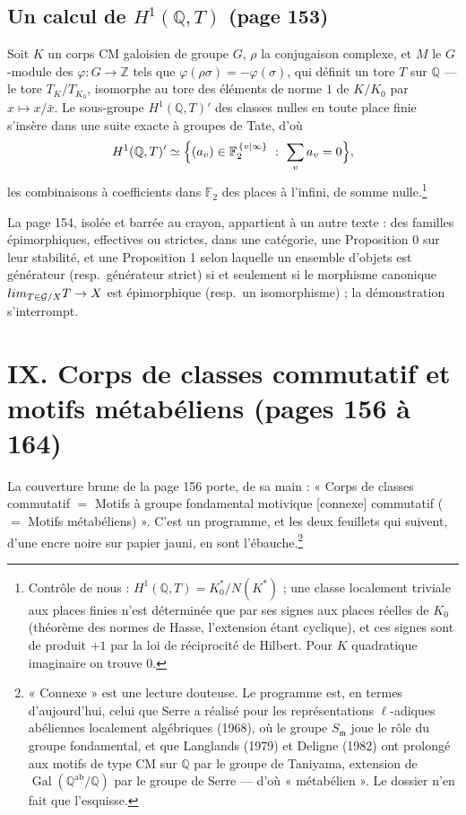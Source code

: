 \documentclass[11pt,a4paper]{article}
\begin{document}
\subsection*{Un calcul de $H^{1}(\mathbb{Q}, T)$ (page 153)}

Soit $K$ un corps CM galoisien de groupe $G$, $\rho$ la conjugaison complexe, et
$M$ le $G$-module des $\varphi \colon G \to \mathbb{Z}$ tels que $\varphi(\rho
\sigma) = -\varphi(\sigma)$, qui définit un tore $T$ sur $\mathbb{Q}$ --- le tore
$T_{K}/T_{K_{0}}$, isomorphe au tore des éléments de norme $1$ de $K/K_{0}$ par
$x \mapsto x/\bar{x}$. Le sous-groupe $H^{1}(\mathbb{Q}, T)'$ des classes nulles
en toute place finie s'insère dans une suite exacte à groupes de Tate, d'où
\[
  H^{1}(\mathbb{Q}, T)' \simeq \Bigl\{ (a_{v}) \in \mathbb{F}_{2}^{\,
  \{v \mid \infty\}} \ :\ \sum_{v} a_{v} = 0 \Bigr\} ,
\]
les combinaisons à coefficients dans $\mathbb{F}_{2}$ des places à l'infini, de
somme nulle.\footnote{Contrôle de nous : $H^{1}(\mathbb{Q}, T) =
K_{0}^{*}/N(K^{*})$ ; une classe localement triviale aux places finies n'est
déterminée que par ses signes aux places réelles de $K_{0}$ (théorème des normes
de Hasse, l'extension étant cyclique), et ces signes sont de produit $+1$ par la
loi de réciprocité de Hilbert. Pour $K$ quadratique imaginaire on trouve $0$.}

La page 154, isolée et barrée au crayon, appartient à un autre texte : des
familles épimorphiques, effectives ou strictes, dans une catégorie, une
Proposition 0 sur leur stabilité, et une Proposition 1 selon laquelle un ensemble d'objets est générateur (resp.\
générateur strict) si et seulement si le morphisme canonique
$\varinjlim_{T \in \mathcal{G}/X} T \to X$ est épimorphique (resp.\ un
isomorphisme) ; la démonstration s'interrompt.

\section*{IX. Corps de classes commutatif et motifs métabéliens (pages 156 à 164)}

La couverture brune de la page 156 porte, de sa main : « Corps de classes
commutatif $=$ Motifs à groupe fondamental motivique [connexe] commutatif ($=$
Motifs métabéliens) ». C'est un programme, et les deux feuillets qui suivent,
d'une encre noire sur papier jauni, en sont l'ébauche.\footnote{« Connexe » est
une lecture douteuse. Le programme est, en termes d'aujourd'hui, celui que
Serre a réalisé pour les représentations $\ell$-adiques abéliennes localement
algébriques (1968), où le groupe $S_{\mathfrak{m}}$ joue le rôle du groupe
fondamental, et que Langlands (1979) et Deligne (1982) ont prolongé aux motifs
de type CM sur $\mathbb{Q}$ par le groupe de Taniyama, extension de
$\operatorname{Gal}(\mathbb{Q}^{\mathrm{ab}}/\mathbb{Q})$ par le groupe de Serre
--- d'où « métabélien ». Le dossier n'en fait que l'esquisse.}
\end{document}
